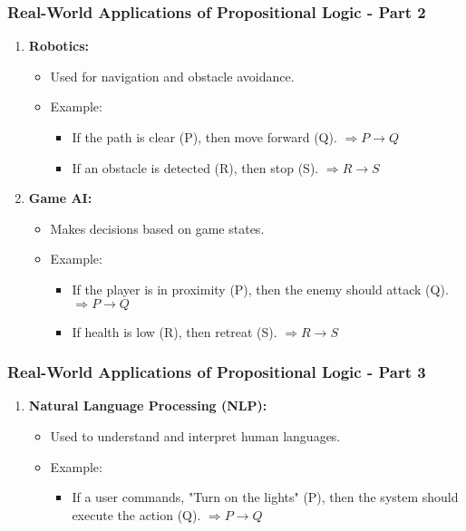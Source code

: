 \documentclass[aspectratio=169]{beamer}
\begin{document}
\begin{frame}[fragile]
    \frametitle{Real-World Applications of Propositional Logic - Part 2}
    \begin{enumerate}
        \item \textbf{Robotics:}
            \begin{itemize}
                \item Used for navigation and obstacle avoidance.
                \item Example: 
                \begin{itemize}
                    \item If the path is clear (P), then move forward (Q). $\Rightarrow P \rightarrow Q$
                    \item If an obstacle is detected (R), then stop (S). $\Rightarrow R \rightarrow S$
                \end{itemize}
            \end{itemize}

        \item \textbf{Game AI:}
            \begin{itemize}
                \item Makes decisions based on game states.
                \item Example:
                \begin{itemize}
                    \item If the player is in proximity (P), then the enemy should attack (Q). $\Rightarrow P \rightarrow Q$
                    \item If health is low (R), then retreat (S). $\Rightarrow R \rightarrow S$
                \end{itemize}
            \end{itemize}
    \end{enumerate}
\end{frame}

\begin{frame}[fragile]
    \frametitle{Real-World Applications of Propositional Logic - Part 3}
    \begin{enumerate}
        \item \textbf{Natural Language Processing (NLP):}
            \begin{itemize}
                \item Used to understand and interpret human languages.
                \item Example:
                \begin{itemize}
                    \item If a user commands, "Turn on the lights" (P), then the system should execute the action (Q). $\Rightarrow P \rightarrow Q$
                \end{itemize}
            \end{itemize}
    \end{enumerate}
\end{frame}
\end{document}
